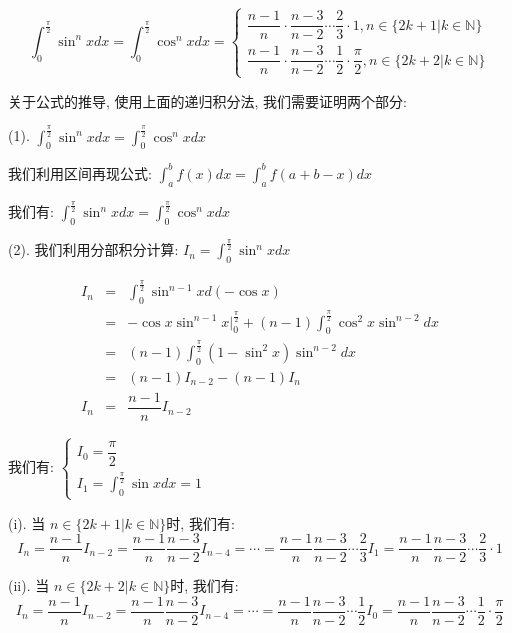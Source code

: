 \begin{theorem}[华里士公式]
	$$\int_{0}^{\frac{\pi}{2}}\sin^{n}x dx = \int_{0}^{\frac{\pi}{2}}\cos^{n} xdx =
	\begin{cases} 
	\dfrac{n-1}{n}\cdot \dfrac{n-3}{n-2}\cdots \dfrac{2}{3}\cdot 1, n\in \{2k+1|k\in \mathbb{N}\} \\
	\dfrac{n-1}{n}\cdot \dfrac{n-3}{n-2}\cdots \dfrac{1}{2}\cdot \dfrac{\pi}{2}, n\in \{2k+2|k\in \mathbb{N}\}  
	\end{cases}$$

	关于公式的推导, 使用上面的递归积分法, 我们需要证明两个部分:

	(1). $\int_{0}^{\frac{\pi}{2}}\sin^{n}x dx = \int_{0}^{\frac{\pi}{2}}\cos^{n}x dx$

	我们利用区间再现公式: $\int_{a}^{b}f(x)dx = \int_{a}^{b}f(a+b-x) dx$

	我们有: $\int_{0}^{\frac{\pi}{2}}\sin^{n}x dx = \int_{0}^{\frac{\pi}{2}}\cos^{n}x dx$

	(2). 我们利用分部积分计算: $I_{n} = \int_{0}^{\frac{\pi}{2}}\sin^{n} xdx$
	
	\begin{eqnarray*}
		I_{n} &=& \int_{0}^{\frac{\pi}{2}} \sin^{n-1}x d(-\cos x)\\
			  &=& -\cos x\sin^{n-1}x \big|_{0}^{\frac{\pi}{2}} + (n-1)\int_{0}^{\frac{\pi}{2}}\cos^{2}x\sin^{n-2}dx\\
			  &=& (n-1)\int_{0}^{\frac{\pi}{2}}(1-\sin^{2}x)\sin^{n-2}dx\\ 
			  &=& (n-1)I_{n-2} - (n-1)I_{n}\\
		I_{n} &=& \dfrac{n-1}{n}I_{n-2}
	\end{eqnarray*}

	我们有: $\begin{cases} I_{0} = \dfrac{\pi}{2}  \\ I_{1} = \int_{0}^{\frac{\pi}{2}}\sin xdx = 1  \end{cases}$

	(i). 当 $n \in\{2k+1|k\in \mathbb{N}\}$时, 我们有:
	$$I_{n} = \dfrac{n-1}{n}I_{n-2} =  \dfrac{n-1}{n}\dfrac{n-3}{n-2}I_{n-4} =\cdots =  \dfrac{n-1}{n}\dfrac{n-3}{n-2}\cdots \dfrac{2}{3}I_{1} = \dfrac{n-1}{n}\dfrac{n-3}{n-2}\cdots \dfrac{2}{3}\cdot 1$$

	(ii). 当 $n \in\{2k+2|k\in \mathbb{N}\}$时, 我们有:
	$$I_{n} = \dfrac{n-1}{n}I_{n-2} =  \dfrac{n-1}{n}\dfrac{n-3}{n-2}I_{n-4} =\cdots =  \dfrac{n-1}{n}\dfrac{n-3}{n-2}\cdots \dfrac{1}{2}I_{0} = \dfrac{n-1}{n}\dfrac{n-3}{n-2}\cdots \dfrac{1}{2}\cdot \dfrac{\pi}{2}$$


\end{theorem}
